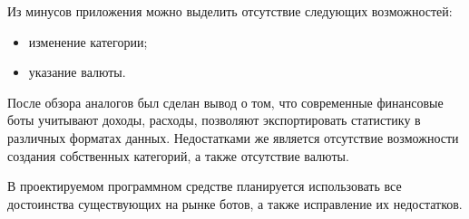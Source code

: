 \newpage

Из минусов приложения можно выделить отсутствие следующих возможностей:

\begin{itemize}
	\item изменение категории;
	\item указание валюты.
\end{itemize}

После обзора аналогов был сделан вывод о том, что современные финансовые боты учитывают доходы, расходы, позволяют экспортировать статистику в различных форматах данных. Недостатками же является отсутствие возможности создания собственных категорий, а также отсутствие валюты.

В проектируемом программном средстве планируется использовать все достоинства существующих на рынке ботов, а также исправление их недостатков.


